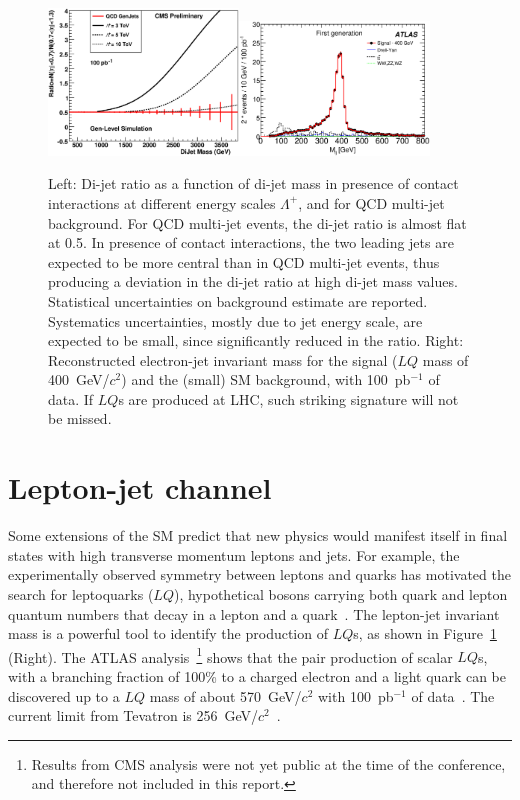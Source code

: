 \documentclass{cimento}
\begin{document}
\begin{figure}[htbp] 
\centering
\includegraphics[width=0.45\textwidth]{DiJetRatio100pbOptFix.eps}\includegraphics[width=0.45\textwidth]{Mejfig5R.eps}  
\caption{Left: Di-jet ratio as a function of di-jet mass in presence of 
contact interactions at different energy scales $\Lambda^{+}$, 
and for QCD multi-jet background. 
For QCD multi-jet events, the di-jet ratio is almost flat at 0.5. 
In presence of contact interactions, the two 
leading jets are expected to be more central than in QCD multi-jet events, 
thus producing a deviation in the di-jet ratio at high di-jet mass values.
Statistical uncertainties on background estimate are reported.  
Systematics uncertainties, mostly due to jet energy scale, are expected to be small, 
since significantly reduced in the ratio.
Right: Reconstructed electron-jet invariant mass for the signal 
($LQ$ mass of 400~GeV/$c^2$) and the (small) SM background, 
with 100~pb$^{-1}$ of data. If $LQ$s are produced at LHC, 
such striking signature will not be missed.}
\label{fig:DiJetRatioAndLQMej}
\end{figure}

\section{Lepton-jet channel} \label{leptonjet}
Some extensions of the SM predict that new physics would manifest itself in 
final states with high transverse momentum leptons and jets.
For example, the experimentally observed symmetry between 
leptons and quarks has motivated the search for leptoquarks ($LQ$), 
hypothetical bosons carrying both quark and lepton quantum numbers 
that decay in a lepton and a quark~\cite{Acosta:1999ws}.
The lepton-jet invariant mass is a powerful tool to identify the production 
of $LQ$s, as shown in Figure~\ref{fig:DiJetRatioAndLQMej} (Right). 
The ATLAS analysis~\footnote{Results from CMS analysis were not yet public at the time 
of the conference, and therefore not included in this report.} 
shows that the pair production of scalar $LQ$s, with a branching fraction of 100\% 
to a charged electron and a light quark can be discovered up to a $LQ$ 
mass of about 570~GeV/$c^2$ with 100~pb$^{-1}$ of data~\cite{LQATLAS}. 
The current limit from Tevatron is 256~GeV/$c^2$~\cite{Abazov:2004mk}.
\end{document}
